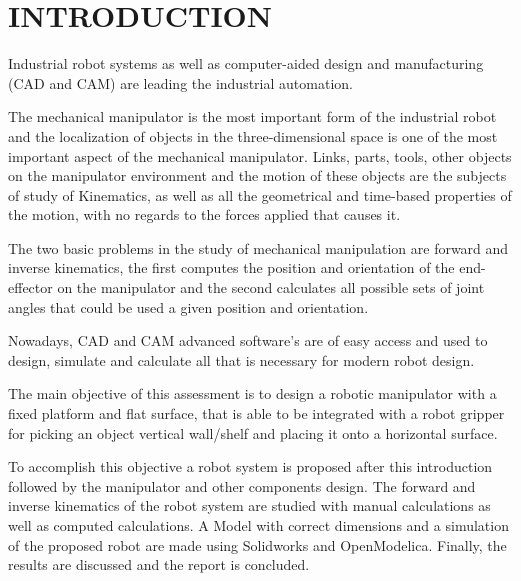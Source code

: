\documentclass[transmag]{IEEEtran}
\begin{document}
\maketitle
\thispagestyle{empty}

\clearpage
\newpage

\clearpage\thispagestyle{empty}
\onecolumn
\tableofcontents

\clearpage
\newpage

\twocolumn

\section{INTRODUCTION}

Industrial robot systems as well as computer-aided design and manufacturing (CAD and CAM) are leading the industrial automation. \cite{ref1}

The mechanical manipulator is the most important form of the industrial robot and the localization of objects in the three-dimensional space is one of the most important aspect of the mechanical manipulator. Links, parts, tools, other objects on the manipulator environment and the motion of these objects are the subjects of study of Kinematics,  as well as all the geometrical and time-based properties of the motion, with no regards to the forces applied that causes it.

The two basic problems in the study of mechanical manipulation are forward and inverse kinematics, the first computes the position and orientation of the end-effector on the manipulator and the second calculates all possible sets of joint angles that could be used  a given position and orientation. 

Nowadays, CAD and CAM advanced software's are of easy access and used to design, simulate and calculate all that is necessary for modern robot design.

The main objective of this assessment is to design a robotic manipulator with a fixed platform and flat surface, that is able to be integrated with a robot gripper for picking an object vertical wall/shelf and placing it onto a horizontal surface. 

To accomplish this objective a robot system is proposed after this introduction followed by the manipulator and other components design. The forward and inverse kinematics of the robot system are studied with manual calculations as well as computed calculations. A Model with correct dimensions and a simulation of the proposed robot are made using Solidworks and OpenModelica. Finally, the results are discussed and the report is concluded.
\end{document}
